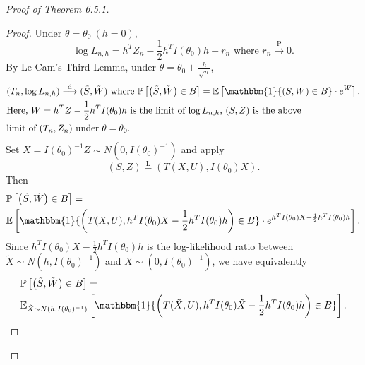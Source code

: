 \documentclass[a4paper]{article}
\begin{document}
\begin{proof}[Proof of Theorem 6.5.1]
\begin{itemize}[leftmargin=*]
		\begin{proof}
			Under $\theta = \theta_0 \ (h = 0)$,
			\begin{equation*}
				\log L_{n,h} = h^T Z_n - \frac{1}{2}h^TI(\theta_0)h + r_n \text{ where } r_n \stackrel{\text{P}}{\longrightarrow} 0.
			\end{equation*}
			By Le Cam's Third Lemma, under $\theta = \theta_0 + \frac{h}{\sqrt{n}}$,
			\begin{equation*}
				\begin{aligned}
					& (T_n, \log L_{n,h}) \stackrel{\text{d}}{\longrightarrow} (\tilde{S},\tilde{W}) \ \text{where } \mathbb{P}\left[\left(\tilde{S},\tilde{W}\right) \in B\right] = \mathbb{E} \left[ \mathbbm{1} \{(S,W) \in B\} \cdot e^W \right]. \\
					& \text{Here, $W = h^T Z - \frac{1}{2}h^TI(\theta_0)h$ is the limit of $\log L_{n,h}$, $(S,Z)$ is the above} \\
					& \text{limit of $(T_n,Z_n)$ under $\theta = \theta_0$.}
				\end{aligned}	
			\end{equation*}
			Set $X = I(\theta_0)^{-1} Z \sim N\left(0,I(\theta_0)^{-1}\right)$ and apply
			\begin{equation*}
				(S,Z) \stackrel{\text{L}}{=} \left(T(X,U), I(\theta_0)X\right).
			\end{equation*}
			Then
			\begin{equation*}
				\begin{aligned}
					& \mathbb{P}\left[\left(\tilde{S},\tilde{W}\right) \in B\right] = \\
					& \mathbb{E} \left[ \mathbbm{1} \{\left(T(X,U),h^TI(\theta_0)X - \frac{1}{2} h^T I(\theta_0) h\right) \in B\} \cdot e^{h^TI(\theta_0)X - \frac{1}{2} h^T I(\theta_0) h}\right].
				\end{aligned}
			\end{equation*}
			Since $h^TI(\theta_0)X - \frac{1}{2} h^T I(\theta_0) h$ is the log-likelihood ratio between $\tilde{X} \sim N\left(h,I(\theta_0)^{-1}\right)$ and $X \sim \left(0,I(\theta_0)^{-1}\right)$, we have equivalently
			\begin{equation*}
				\begin{aligned}
					& \mathbb{P}\left[\left(\tilde{S},\tilde{W}\right) \in B\right] = \\
					& \mathbb{E}_{\tilde{X} \sim N(h,I(\theta_0)^{-1})} \left[ \mathbbm{1} \{\left(T(\tilde{X},U),h^TI(\theta_0)\tilde{X} - \frac{1}{2} h^T I(\theta_0) h\right) \in B\} \right].
				\end{aligned}

\end{equation*}
\end{proof}
\end{itemize}
\end{proof}
\end{document}
